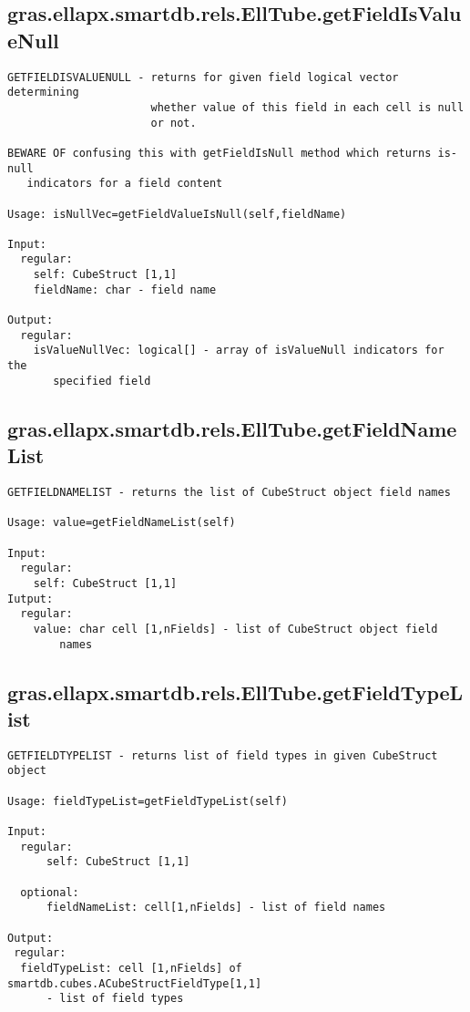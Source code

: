 \subsection{\texorpdfstring{gras.ellapx.smartdb.rels.EllTube.getFieldIsValueNull}{getFieldIsValueNull}}\label{method:gras.ellapx.smartdb.rels.EllTube.getFieldIsValueNull}
\begin{verbatim}
GETFIELDISVALUENULL - returns for given field logical vector determining
                      whether value of this field in each cell is null
                      or not.

BEWARE OF confusing this with getFieldIsNull method which returns is-null
   indicators for a field content

Usage: isNullVec=getFieldValueIsNull(self,fieldName)

Input:
  regular:
    self: CubeStruct [1,1]
    fieldName: char - field name

Output:
  regular:
    isValueNullVec: logical[] - array of isValueNull indicators for the
       specified field
\end{verbatim}
\subsection{\texorpdfstring{gras.ellapx.smartdb.rels.EllTube.getFieldNameList}{getFieldNameList}}\label{method:gras.ellapx.smartdb.rels.EllTube.getFieldNameList}
\begin{verbatim}
GETFIELDNAMELIST - returns the list of CubeStruct object field names

Usage: value=getFieldNameList(self)

Input:
  regular:
    self: CubeStruct [1,1]
Iutput:
  regular:
    value: char cell [1,nFields] - list of CubeStruct object field
        names
\end{verbatim}
\subsection{\texorpdfstring{gras.ellapx.smartdb.rels.EllTube.getFieldTypeList}{getFieldTypeList}}\label{method:gras.ellapx.smartdb.rels.EllTube.getFieldTypeList}
\begin{verbatim}
GETFIELDTYPELIST - returns list of field types in given CubeStruct object

Usage: fieldTypeList=getFieldTypeList(self)

Input:
  regular:
      self: CubeStruct [1,1]

  optional:
      fieldNameList: cell[1,nFields] - list of field names

Output:
 regular:
  fieldTypeList: cell [1,nFields] of smartdb.cubes.ACubeStructFieldType[1,1]
      - list of field types
\end{verbatim}
